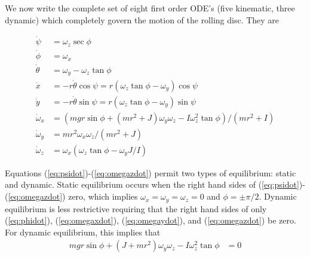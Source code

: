 \documentclass[letterpaper,11pt]{article}
\begin{document}
We now write the complete set of eight first order ODE's (five kinematic, three
dynamic) which completely govern the motion of the rolling disc.  They are

\begin{align}
    \label{eq:psidot}
    \dot{\psi} &= \omega_z \sec{\phi} \\
    \label{eq:phidot}
    \dot{\phi} &= \omega_x \\
    \label{eq:thetadot}
    \dot{\theta} &= \omega_y - \omega_z \tan{\phi} \\
    \label{eq:xdot}
    \dot{x} &= -r\dot{\theta}\cos{\psi} = r(\omega_z \tan{\phi} - \omega_y)\cos{\psi} \\
    \label{eq:ydot}
    \dot{y} &= -r\dot{\theta}\sin{\psi} = r(\omega_z \tan{\phi} - \omega_y)\sin{\psi} \\
    \label{eq:omegaxdot}
    \dot{\omega}_x &= (mgr\sin{\phi} + (mr^2 + J)\omega_y\omega_z -
    I\omega_z^2\tan{\phi})/(mr^2 + I) \\
    \label{eq:omegaydot}
    \dot{\omega}_y &= mr^2\omega_x\omega_z/(mr^2 + J) \\
    \label{eq:omegazdot}
    \dot{\omega}_z &= \omega_x(\omega_z \tan{\phi} - \omega_y J/I)
\end{align}

Equations (\ref{eq:psidot})-(\ref{eq:omegazdot}) permit two types of
equilibrium: static and dynamic.  Static equilibrium occurs when the right hand
sides of (\ref{eq:psidot})-(\ref{eq:omegazdot}) zero, which implies
$\omega_x=\omega_y=\omega_z=0$ and $\phi=\pm\pi/2$.  Dynamic equilibrium is
less restrictive requiring that the right hand sides of only 
(\ref{eq:phidot}), (\ref{eq:omegaxdot}), (\ref{eq:omegaydot}), and
(\ref{eq:omegazdot}) be zero.  For dynamic equilibrium, this implies that
\begin{align}
    mgr\sin{\phi} + (J + mr^2)\omega_y\omega_z - I\omega_z^2\tan{\phi} & = 0
    \label{eq:dyneq}
\end{align}
\end{document}
